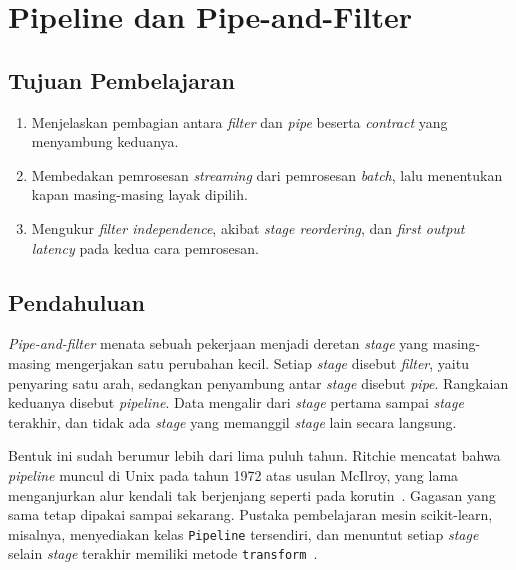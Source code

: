 \chapter{Pipeline dan Pipe-and-Filter}
\label{bab:pipa}

\section*{Tujuan Pembelajaran}

\begin{enumerate}
  \item Menjelaskan pembagian antara \textit{filter} dan \textit{pipe}
    beserta \textit{contract} yang menyambung keduanya.
  \item Membedakan pemrosesan \textit{streaming} dari pemrosesan \textit{batch},
    lalu menentukan kapan masing-masing layak dipilih.
  \item Mengukur \textit{filter independence}, akibat \textit{stage reordering},
    dan \textit{first output latency} pada kedua cara pemrosesan.
\end{enumerate}

\section{Pendahuluan}

\textit{Pipe-and-filter} menata sebuah
pekerjaan menjadi deretan \textit{stage}
yang masing-masing mengerjakan satu perubahan kecil. Setiap \textit{stage} disebut
\textit{filter}, yaitu penyaring satu arah, sedangkan
penyambung antar
\textit{stage} disebut \textit{pipe}. Rangkaian keduanya
disebut
\textit{pipeline}. Data mengalir dari \textit{stage}
pertama sampai
\textit{stage} terakhir, dan tidak ada \textit{stage} yang memanggil \textit{stage}
lain secara langsung.

Bentuk ini sudah berumur lebih dari lima puluh tahun. Ritchie mencatat bahwa
\textit{pipeline} muncul di Unix pada tahun 1972 atas usulan McIlroy, yang lama menganjurkan
alur kendali tak berjenjang seperti pada
korutin~\cite{ritchie1984evolution}. Gagasan yang sama tetap dipakai sampai
sekarang. Pustaka pembelajaran mesin scikit-learn, misalnya, menyediakan kelas
\texttt{Pipeline} tersendiri, dan menuntut setiap \textit{stage} selain
\textit{stage} terakhir memiliki metode
\texttt{transform}~\cite{sklearn2026pipeline}.

